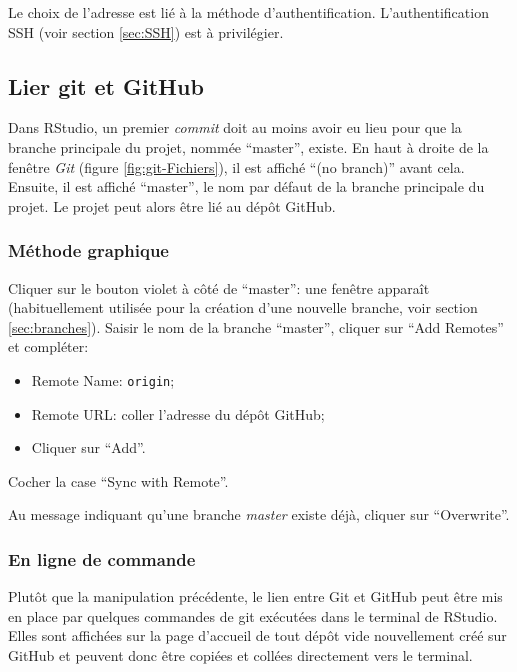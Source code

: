 \documentclass[
  12pt,
  french,
  a4paper,
  extrafontsizes,onecolumn,openright
  ]{memoir}
\providecommand{\tightlist}{%
  \setlength{\itemsep}{0pt}\setlength{\parskip}{0pt}}
\begin{document}
Le choix de l'adresse est lié à la méthode d'authentification.
L'authentification SSH (voir section \ref{sec:SSH}) est à privilégier.

\subsection{Lier git et GitHub}\label{lier-git-et-github}

Dans RStudio, un premier \emph{commit} doit au moins avoir eu lieu pour que la branche principale du projet, nommée \enquote{master}, existe.
En haut à droite de la fenêtre \emph{Git} (figure \ref{fig:git-Fichiers}), il est affiché \enquote{(no branch)} avant cela.
Ensuite, il est affiché \enquote{master}, le nom par défaut de la branche principale du projet.
Le projet peut alors être lié au dépôt GitHub.

\subsubsection{Méthode graphique}\label{muxe9thode-graphique}

Cliquer sur le bouton violet à côté de \enquote{master}: une fenêtre apparaît (habituellement utilisée pour la création d'une nouvelle branche, voir section \ref{sec:branches}).
Saisir le nom de la branche \enquote{master}, cliquer sur \enquote{Add Remotes} et compléter:

\begin{itemize}
\tightlist
\item
  Remote Name: \texttt{origin};
\item
  Remote URL: coller l'adresse du dépôt GitHub;
\item
  Cliquer sur \enquote{Add}.
\end{itemize}

Cocher la case \enquote{Sync with Remote}.

Au message indiquant qu'une branche \emph{master} existe déjà, cliquer sur \enquote{Overwrite}.

\subsubsection{En ligne de commande}\label{en-ligne-de-commande}

Plutôt que la manipulation précédente, le lien entre Git et GitHub peut être mis en place par quelques commandes de git exécutées dans le terminal de RStudio.
Elles sont affichées sur la page d'accueil de tout dépôt vide nouvellement créé sur GitHub et peuvent donc être copiées et collées directement vers le terminal.
\end{document}
